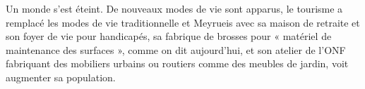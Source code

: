 Un monde s’est éteint. De nouveaux modes de vie sont apparus, le tourisme a remplacé les
modes de vie traditionnelle et Meyrueis avec sa maison de retraite et son foyer de vie pour
handicapés, sa fabrique de brosses pour « matériel de maintenance des surfaces », comme on
dit aujourd’hui, et son atelier de l’ONF fabriquant des mobiliers urbains ou routiers comme
des meubles de jardin, voit augmenter sa population.
